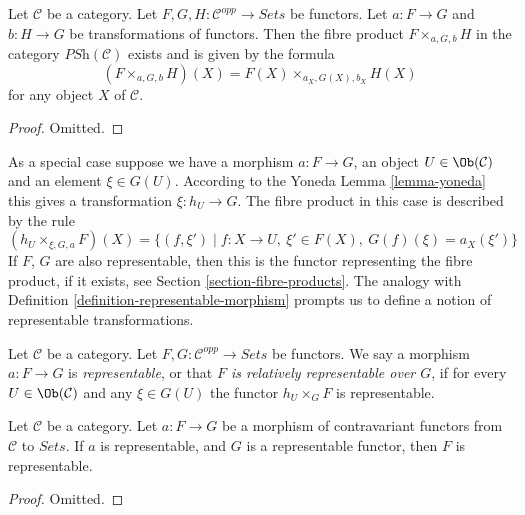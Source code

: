 \begin{lemma}
\label{lemma-fibre-product-presheaves}
Let $\mathcal{C}$ be a category.
Let $F, G, H : \mathcal{C}^{opp} \to \textit{Sets}$
be functors. Let $a : F \to G$ and $b : H \to G$ be
transformations of functors. Then the fibre product
$F \times_{a, G, b} H$ in the category
$\textit{PSh}(\mathcal{C})$
exists and is given by the formula
$$
(F \times_{a, G, b} H)(X) =
F(X) \times_{a_X, G(X), b_X} H(X)
$$
for any object $X$ of $\mathcal{C}$.
\end{lemma}

\begin{proof}
Omitted.
\end{proof}

\noindent
As a special case suppose we have a morphism
$a : F \to G$, an object $U \in \Ob(\mathcal{C})$
and an element $\xi \in G(U)$. According to the Yoneda
Lemma \ref{lemma-yoneda} this gives a transformation
$\xi : h_U \to G$. The fibre product in this case
is described by the rule
$$
(h_U \times_{\xi, G, a} F)(X) =
\{ (f, \xi') \mid f : X \to U, \ \xi' \in F(X), \ G(f)(\xi) = a_X(\xi')\}
$$
If $F$, $G$ are also representable, then this is the functor representing the
fibre product, if it exists, see Section \ref{section-fibre-products}.
The analogy with Definition \ref{definition-representable-morphism}
prompts us to define a notion
of representable transformations.

\begin{definition}
\label{definition-representable-map-presheaves}
Let $\mathcal{C}$ be a category.
Let $F, G : \mathcal{C}^{opp} \to \textit{Sets}$
be functors. We say a morphism $a : F \to G$ is
{\it representable}, or that {\it $F$ is relatively representable
over $G$}, if for every $U \in \Ob(\mathcal{C})$
and any $\xi \in G(U)$ the functor
$h_U \times_G F$ is representable.
\end{definition}

\begin{lemma}
\label{lemma-representable-over-representable}
Let $\mathcal{C}$ be a category.
Let $a : F \to G$ be a morphism of contravariant functors
from $\mathcal{C}$ to $\textit{Sets}$. If $a$ is representable,
and $G$ is a representable functor, then $F$ is representable.
\end{lemma}

\begin{proof}
Omitted.
\end{proof}

